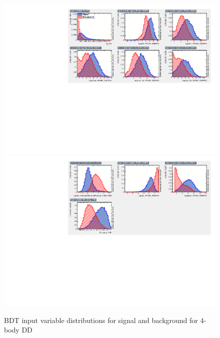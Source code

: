 \begin{figure}[tb]
\includegraphics[width=\linewidth]{figures/selection/inputvariables_KPiPiPi_DD_run2_1.pdf}
\includegraphics[width=\linewidth]{figures/selection/inputvariables_KPiPiPi_DD_run2_2.pdf}
\caption{BDT input variable distributions for signal and background for 4-body DD}
\label{BDTinputdist4bodyDD}
\end{figure}

